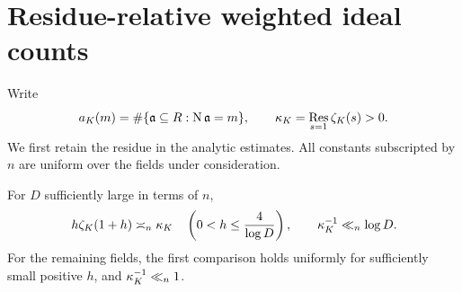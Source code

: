 \section{Residue-relative weighted ideal counts}\label{sec:analytic}

Write
\[
 a_K(m)=\#\{\mathfrak a\subseteq R:\operatorname{N}\mathfrak a=m\},
 \qquad \kappa_K=\operatorname*{Res}_{s=1}\zeta_K(s)>0.
\]
We first retain the residue in the analytic estimates. All constants
subscripted by $n$ are uniform over the fields under consideration.

\begin{lemma}\label{lem:residue}
For $D$ sufficiently large in terms of $n$,
\begin{equation}\label{eq:residue}
 h\zeta_K(1+h)\asymp_n\kappa_K
 \quad\left(0<h\le\frac4{\log D}\right),
 \qquad \kappa_K^{-1}\ll_n\log D.
\end{equation}
For the remaining fields, the first comparison holds uniformly for
sufficiently small positive $h$, and $\kappa_K^{-1}\ll_n1$.
\end{lemma}

